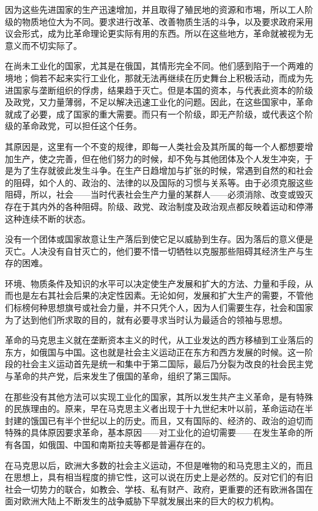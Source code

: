 \documentclass[12pt,oneside]{book}
\begin{document}
\begin{common-format}
因为这些先进国家的生产迅速增加，并且取得了殖民地的资源和市埸，所以工人阶级的物质地位大为不同。要求进行改革、改善物质生活的斗争，以及要求政府采用议会形式，成为比革命理论更实际有用的东西。所以在这些地方，革命就被视为无意义而不切实际了。

在尚未工业化的国家，尤其是在俄国，其情形完全不同。他们感到陷于一个两难的境地；倘若不起来实行工业化，那就无法再继续在历史舞台上积极活动，而成为先进国家与垄断组织的俘虏，结果趋于灭亡。但是本国的资本，与代表此资本的阶级及政党，又力量薄弱，不足以解决迅速工业化的问题。因此，在这些国家中，革命就成了必要，成了国家的重大需要。而只有一个阶级，即无产阶级，或代表这个阶级的革命政党，可以担任这个任务。

其原因是，这里有一个不变的规律，即每一人类社会及其所属的每一个人都想要增加生产，使之完善，但在他们努力的时候，却不免与其他团体及个人发生冲突，于是为了生存就彼此发生斗争。在生产日趋增加与扩张的时候，常遇到自然的和社会的阻碍，如个人的、政治的、法律的以及国际的习惯与关系等。由于必须克服这些阻碍，所以，社会——当时代表社会生产力量的某群人——必须消除、改变或毁灭存在于其内外的各种阻碍。阶级、政党、政治制度及政治观点都反映着运动和停滞这种连续不断的状态。

没有一个团体或国家故意让生产落后到使它足以威胁到生存。因为落后的意义便是灭亡。人决没有自甘灭亡的，他们要不惜一切牺牲以克服那些阻碍其经济生产与生存的困难。

环境、物质条件及知识的水平可以决定使生产发展和扩大的方法、力量和手段，从而也是左右其社会后果的决定性因素。无论如何，发展和扩大生产的需要，不管他们标榜何种思想旗号或社会力量，并不只凭个人，因为人们需要生存，社会和国家为了达到他们所求取的目的，就有必要寻求当时认为最适合的领袖与思想。

革命的马克思主义就在垄断资本主义的时代，从工业发达的西方移植到工业落后的东方，如俄国与中国。这也就是社会主义运动正在东方和西方发展的时候。这一阶段的社会主义运动首先是统一和集中于第二国际，最后乃分裂为改良的社会民主党与革命的共产党，后来发生了俄国的革命，组织了第三国际。

在那些没有其他方法可以实现工业化的国家，其所以发生共产主义革命，是有特殊的民族理由的。原来，早在马克思主义者出现于十九世纪末叶以前，革命运动在半封建的饿国已有半个世纪以上的历史。而且，又有国际的、经济的、政治的迫切而特殊的具体原因要求革命，基本原因——对工业化的迫切需要——在发生革命的所有各国，如俄国、中国和南斯拉夫等都是普遍存在的。

在马克思以后，欧洲大多数的社会主义运动，不但是唯物的和马克思主义的，而且在思想上，具有相当程度的排它性，这可以说在历史上是必然的。反对它们的有旧社会一切势力的联合，如教会、学枝、私有财产、政府，更重要的还有欧洲各国在面对欧洲大陆上不断发生的战争威胁下早就发展出来的巨大的权力机构。


\end{common-format}
\end{document}
